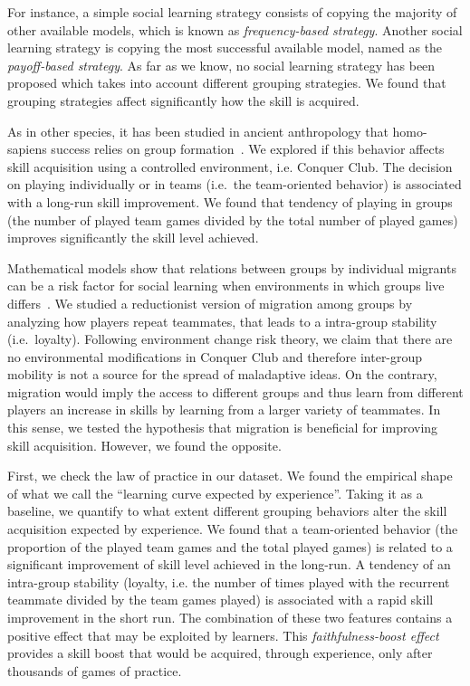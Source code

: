 \documentclass[a4paper,10pt]{book}
\theoremstyle{definition}
\begin{document}
For instance, a simple social learning strategy consists of copying the majority of other available models, which is known as \emph{frequency-based strategy}.
Another social learning strategy is copying the most successful available model, named as the \emph{payoff-based strategy}.
As far as we know, no social learning strategy has been proposed which takes into account different grouping strategies.
We found that grouping strategies affect significantly how the skill is acquired.

As in other species, it has been studied in ancient anthropology that homo-sapiens success relies on group formation~\cite{Richerson2010,dunbar1993-coevolutionNeocorticalSizeGroupSizeAndLanguage}.
We explored if this behavior affects skill acquisition using a controlled environment, i.e. Conquer Club.
The decision on playing individually or in teams (i.e.~the team-oriented behavior) is associated with a long-run skill improvement.
We found that tendency of playing in groups (the number of played team games divided by the total number of played games) improves significantly the skill level achieved.

Mathematical models show that relations between groups by individual migrants can be a risk factor for social learning when environments in which groups live differs~\cite{boyd1989-socialLearningAsAdaptation}.
We studied a reductionist version of migration among groups by analyzing how players repeat teammates, that leads to a intra-group stability (i.e.~loyalty).
Following environment change risk theory, we claim that there are no environmental modifications in Conquer Club and therefore inter-group mobility is not a source for the spread of maladaptive ideas.
On the contrary, migration would imply the access to different groups and thus learn from different players an increase in skills by learning from a larger variety of teammates.
In this sense, we tested the hypothesis that migration is beneficial for improving skill acquisition.
However, we found the opposite. 

First, we check the law of practice in our dataset.
We found the empirical shape of what we call the ``learning curve expected by experience''.
Taking it as a baseline, we quantify to what extent different grouping behaviors alter the skill acquisition expected by experience.
We found that a team-oriented behavior (the proportion of the played team games and the total played games) is related to a significant improvement of skill level achieved in the long-run.
A tendency of an intra-group stability (loyalty, i.e. the number of times played with the recurrent teammate divided by the team games played) is associated with a rapid skill improvement in the short run.
The combination of these two features contains a positive effect that may be exploited by learners. 
This \emph{faithfulness-boost effect} provides a skill boost that would be acquired, through experience, only after thousands of games of practice.
\end{document}

